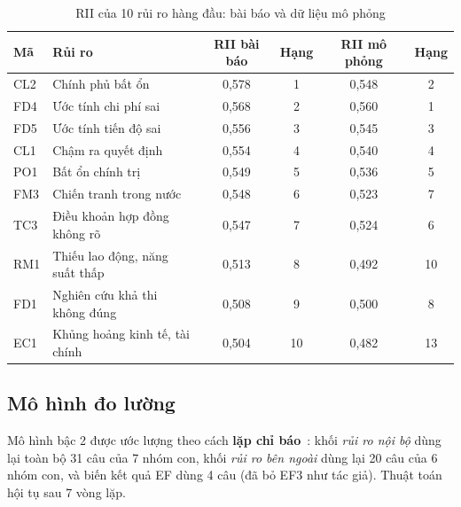 \begin{table}[H]
\centering
\caption{RII của 10 rủi ro hàng đầu: bài báo và dữ liệu mô phỏng}
\label{tab:mp-rii}
\begin{tabular}{@{}llcccc@{}}
\toprule
\textbf{Mã} & \textbf{Rủi ro} & \textbf{RII bài báo} & \textbf{Hạng} & \textbf{RII mô phỏng} & \textbf{Hạng} \\
\midrule
CL2 & Chính phủ bất ổn & 0,578 & 1 & 0,548 & 2 \\
FD4 & Ước tính chi phí sai & 0,568 & 2 & 0,560 & 1 \\
FD5 & Ước tính tiến độ sai & 0,556 & 3 & 0,545 & 3 \\
CL1 & Chậm ra quyết định & 0,554 & 4 & 0,540 & 4 \\
PO1 & Bất ổn chính trị & 0,549 & 5 & 0,536 & 5 \\
FM3 & Chiến tranh trong nước & 0,548 & 6 & 0,523 & 7 \\
TC3 & Điều khoản hợp đồng không rõ & 0,547 & 7 & 0,524 & 6 \\
RM1 & Thiếu lao động, năng suất thấp & 0,513 & 8 & 0,492 & 10 \\
FD1 & Nghiên cứu khả thi không đúng & 0,508 & 9 & 0,500 & 8 \\
EC1 & Khủng hoảng kinh tế, tài chính & 0,504 & 10 & 0,482 & 13 \\
\bottomrule
\end{tabular}
\end{table}

\subsection{Mô hình đo lường}

Mô hình bậc 2 được ước lượng theo cách \textbf{lặp chỉ báo}~\cite{sarstedt2019hoc}: khối \emph{rủi ro nội bộ} dùng lại toàn bộ 31 câu của 7 nhóm con, khối \emph{rủi ro bên ngoài} dùng lại 20 câu của 6 nhóm con, và biến kết quả EF dùng 4 câu (đã bỏ EF3 như tác giả). Thuật toán hội tụ sau 7 vòng lặp.


